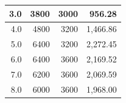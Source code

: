 \begin{table}[h]
\begin{tabular}{|r|r|r|r|}
3.0                                                                                                      & 3800                                                                                            & 3000                                                                                             & 956.28                                                                                          \\ \hline
4.0                                                                                                      & 4800                                                                                            & 3200                                                                                             & 1,466.86                                                                                        \\ \hline
5.0                                                                                                      & 6400                                                                                            & 3200                                                                                             & 2,272.45                                                                                        \\ \hline
6.0                                                                                                      & 6400                                                                                            & 3600                                                                                             & 2,169.52                                                                                        \\ \hline
7.0                                                                                                      & 6200                                                                                            & 3600                                                                                             & 2,069.59                                                                                        \\ \hline
8.0                                                                                                      & 6000                                                                                            & 3600                                                                                             & 1,968.00                                                                                        \\ \hline

\end{tabular}
\end{table}
